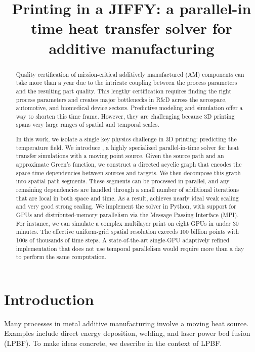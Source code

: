 \documentclass[conference]{IEEEtran}
\begin{document}
\title{Printing in a JIFFY: a parallel-in time heat transfer solver for additive manufacturing
  \vspace*{-30pt}
}

\maketitle
\begin{abstract}
Quality certification of mission-critical additively manufactured (AM) components can take more than a year due to the intricate coupling between the process parameters and the resulting part quality.  
This lengthy certification requires finding the right process parameters  and creates major bottlenecks in R\&D  across the aerospace, automotive, and biomedical device sectors.  
Predictive modeling and simulation offer a way to shorten this time frame. 
However, they are challenging because 3D printing spans very large ranges of spatial and temporal scales.

In this work, we isolate a single key physics challenge in 3D printing: predicting the temperature field.  
We introduce \method,  a highly specialized parallel-in-time solver for heat transfer simulations with a moving point source.
Given the source path and an approximate Green’s function, we construct a directed acyclic graph that encodes the space-time dependencies between sources and targets. We then decompose this graph into spatial path segments.  
These segments can be processed in parallel, and any remaining dependencies are handled through a small number of additional iterations that are local in both space and time.  
As a result, \method achieves nearly ideal weak scaling and very good strong scaling.  
We implement the solver in Python, with support for GPUs and distributed-memory parallelism via the Message Passing Interface (MPI).  
For instance, we can simulate a complex multilayer print on eight GPUs in under 30 minutes.  
The effective uniform-grid spatial resolution exceeds  100 billion points with 100s of thousands of time steps. 
A state-of-the-art single-GPU adaptively refined implementation that does not use temporal parallelism would require more than a day to perform the same computation.
\end{abstract}


\section{Introduction}
Many processes in metal additive manufacturing involve a moving heat source. 
Examples include direct energy deposition, welding, and laser power bed fusion (LPBF). 
To make ideas concrete, we describe \method in the context of LPBF.
\end{document}
